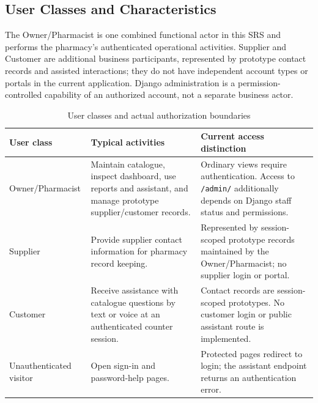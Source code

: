 \documentclass{article}
\begin{document}
\subsection{User Classes and Characteristics}
The Owner/Pharmacist is one combined functional actor in this SRS and performs the pharmacy's authenticated operational activities. Supplier and Customer are additional business participants, represented by prototype contact records and assisted interactions; they do not have independent account types or portals in the current application. Django administration is a permission-controlled capability of an authorized account, not a separate business actor.
\begin{table}[H]
\centering\small
\caption{User classes and actual authorization boundaries}
\begin{tabularx}{\textwidth}{L{30mm}YY}
\toprule User class & Typical activities & Current access distinction\\\midrule
Owner/Pharmacist & Maintain catalogue, inspect dashboard, use reports and assistant, and manage prototype supplier/customer records. & Ordinary views require authentication. Access to \texttt{/admin/} additionally depends on Django staff status and permissions.\\
Supplier & Provide supplier contact information for pharmacy record keeping. & Represented by session-scoped prototype records maintained by the Owner/Pharmacist; no supplier login or portal.\\
Customer & Receive assistance with catalogue questions by text or voice at an authenticated counter session. & Contact records are session-scoped prototypes. No customer login or public assistant route is implemented.\\
Unauthenticated visitor & Open sign-in and password-help pages. & Protected pages redirect to login; the assistant endpoint returns an authentication error.\\
\bottomrule
\end{tabularx}
\end{table}
\end{document}
